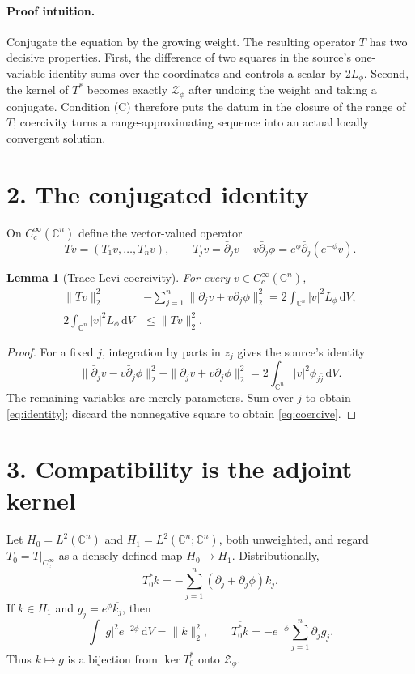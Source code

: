 \documentclass[10pt,a4paper]{article}
\newtheorem{lemma}{Lemma}
\newcommand{\C}{\mathbb C}
\newcommand{\dd}{\,\mathrm d}
\newcommand{\dbar}{\bar\partial}
\begin{document}
\paragraph{Proof intuition.}
Conjugate the equation by the growing weight.  The resulting operator $T$
has two decisive properties.  First, the difference of two squares in the
source's one-variable identity sums over the coordinates and controls a
scalar by $2L_\phi$.  Second, the kernel of $T^*$ becomes exactly
$\mathcal Z_\phi$ after undoing the weight and taking a conjugate.  Condition
(C) therefore puts the datum in the closure of the range of $T$; coercivity
turns a range-approximating sequence into an actual locally convergent
solution.

\section*{2. The conjugated identity}

On $C_c^\infty(\C^n)$ define the vector-valued operator
\[
 Tv=(T_1v,\ldots,T_nv),\qquad
 T_jv=\dbar_jv-v\dbar_j\phi
      =e^\phi\dbar_j(e^{-\phi}v).
\]

\begin{lemma}[Trace-Levi coercivity]\label{lem:coercive}
For every $v\in C_c^\infty(\C^n)$,
\begin{align}
 \|Tv\|_2^2
 &-\sum_{j=1}^n\|\partial_jv+v\partial_j\phi\|_2^2
   =2\int_{\C^n}|v|^2L_\phi\dd V,\label{eq:identity}\\
 2\int_{\C^n}|v|^2L_\phi\dd V&\le\|Tv\|_2^2.\label{eq:coercive}
\end{align}
\end{lemma}

\begin{proof}
For a fixed $j$, integration by parts in $z_j$ gives the source's identity
\[
 \|\dbar_jv-v\dbar_j\phi\|_2^2
 -\|\partial_jv+v\partial_j\phi\|_2^2
 =2\int_{\C^n}|v|^2\phi_{j\bar j}\dd V.
\]
The remaining variables are merely parameters.  Sum over $j$ to obtain
\eqref{eq:identity}; discard the nonnegative square to obtain
\eqref{eq:coercive}.
\end{proof}

\section*{3. Compatibility is the adjoint kernel}

Let $H_0=L^2(\C^n)$ and $H_1=L^2(\C^n;\C^n)$, both unweighted, and regard
$T_0=T|_{C_c^\infty}$ as a densely defined map $H_0\to H_1$.
Distributionally,
\begin{equation}\label{eq:adjoint}
 T_0^*k=-\sum_{j=1}^n(\partial_j+\partial_j\phi)k_j.
\end{equation}
If $k\in H_1$ and $g_j=e^\phi\overline{k_j}$, then
\[
 \int|g|^2e^{-2\phi}\dd V=\|k\|_2^2,
 \qquad
 \overline{T_0^*k}
 =-e^{-\phi}\sum_{j=1}^n\dbar_jg_j.
\]
Thus $k\mapsto g$ is a bijection from $\ker T_0^*$ onto
$\mathcal Z_\phi$.
\end{document}
